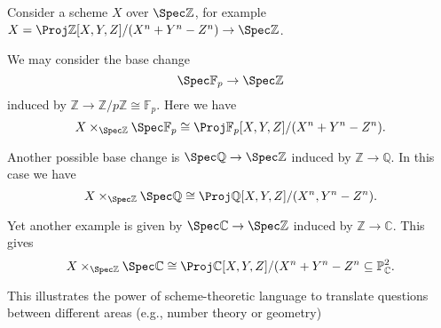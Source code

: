 Consider a scheme $X$ over $\Spec \mathbb{Z}$, for example
$X = \Proj \mathbb{Z}[X, Y, Z]/(X^n + Y^n - Z^n)\to \Spec \mathbb{Z}$.

We may consider the base change
\[ \Spec \mathbb{F}_p \to \Spec \mathbb{Z} \]
induced by $\mathbb{Z}\to \mathbb{Z}/p\mathbb{Z} \cong \mathbb{F}_p$. Here
we have
\[ X\times_{\Spec \mathbb{Z}} \Spec \mathbb{F}_p \cong \Proj \mathbb{F}_p[X, Y, Z]/(X^n + Y^n - Z^n). \]

Another possible base change is $\Spec \mathbb{Q}\to \Spec\mathbb{Z}$ induced by
$\mathbb{Z}\to \mathbb{Q}$. In this case we have
\[ X\times_{\Spec \mathbb{Z}}\Spec \mathbb{Q} \cong \Proj \mathbb{Q}[X, Y, Z]/(X^n, Y^n - Z^n). \]

Yet another example is given by $\Spec \mathbb{C}\to \Spec \mathbb{Z}$ induced by
$\mathbb{Z}\to \mathbb{C}$. This gives
\[ X\times_{\Spec \mathbb{Z}} \Spec \mathbb{C}\cong \Proj \mathbb{C}[X, Y, Z]/(X^n + Y^n - Z^n \subseteq \mathbb{P}_{\mathbb{C}}^2. \]

This illustrates the power of scheme-theoretic language to translate questions
between different areas (e.g., number theory or geometry)
